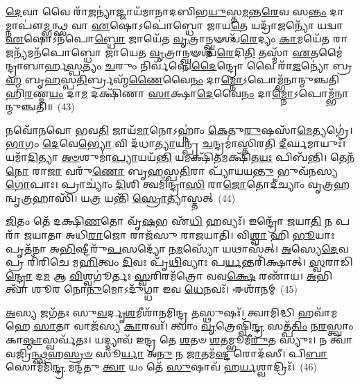 \-\ul{𑌦𑍇}\-𑌵𑌾 𑌵𑍈 𑌰𑌾᳴\-\ul{𑌜}\-𑌨𑍍𑌯𑌾॑𑌜𑍍𑌜𑌾𑌯᳴𑌮𑌾𑌨𑌾𑌦𑌬𑌿𑌭\-\ul{𑌯𑍁}\-𑌸𑍍𑌤\-\ul{𑌮}\-𑌨𑍍𑌤\-\ul{𑌰𑍇}\-𑌵 𑌸\-\ul{𑌨𑍍𑌤𑌂} 𑌦𑌾𑌮𑍍𑌨𑌾𑌪𑍗॑\-\ul{𑌮𑍍𑌭}\-𑌨𑍍𑌥𑍍𑌸 𑌵𑌾 \ul{𑌏}\-𑌷𑍋\-𑌽𑌪𑍋॑𑌬𑍍𑌧𑍋 𑌜𑌾𑌯\-\ul{𑌤𑍇} 𑌯𑌦𑍍𑌰𑌾᳴\-\ul{𑌜}\-𑌨𑍍𑌯𑍋᳴ 𑌯𑌦𑍍𑌵𑌾 \ul{𑌏}\-𑌷𑍋\-𑌽𑌨᳴𑌪𑍋\-\ul{𑌬𑍍𑌧𑍋} 𑌜𑌾𑌯𑍇᳴𑌤 \ul{𑌵𑍃}\-𑌤𑍍𑌰𑌾𑌨𑍍𑌘𑍍𑌨𑍟𑌶𑍍𑌚᳴\-\ul{𑌰𑍇}\-𑌦𑍍𑌯𑌂 \ul{𑌕𑌾}\-𑌮𑌯𑍇᳴𑌤 𑌰𑌾\-\ul{𑌜}\-𑌨𑍍𑌯᳴𑌮𑌨᳴𑌪𑍋𑌬𑍍𑌧𑍋 𑌜𑌾𑌯𑍇𑌤 \ul{𑌵𑍃}\-𑌤𑍍𑌰𑌾𑌨𑍍𑌘𑍍𑌨𑍟𑌶𑍍𑌚᳴\-\ul{𑌰𑍇}\-𑌦𑌿\-\ul{𑌤𑌿} 𑌤𑌸𑍍𑌮𑌾᳴ \ul{𑌏}\-𑌤𑌮𑍈॑𑌨𑍍𑌦𑍍𑌰𑌾𑌬𑌾𑌰𑍍\mbox{}𑌹\-\ul{𑌸𑍍𑌪}\-𑌤𑍍𑌯𑌂 \ul{𑌚}\-𑌰𑍁𑌂 𑌨𑌿𑌰𑍍𑌵᳴𑌪𑍇\-\ul{𑌦𑍈}\-𑌨𑍍𑌦𑍍𑌰𑍋 𑌵𑍈 𑌰𑌾᳴\-\ul{𑌜}\-𑌨𑍍𑌯𑍋॑ 𑌬𑍍𑌰\-\ul{𑌹𑍍𑌮} 𑌬𑍃\-\ul{𑌹}\-𑌸𑍍𑌪\-\ul{𑌤𑌿}\-𑌰𑍍𑌬𑍍𑌰𑌹𑍍𑌮᳴\-\ul{𑌣𑍈}\-𑌵𑍈\-\ul{𑌨𑌂} 𑌦𑌾\-\ul{𑌮𑍍𑌨𑍋}\-\-𑌽𑌪𑍋𑌮𑍍𑌭᳴𑌨𑌾𑌨𑍍𑌮𑍁𑌞𑍍𑌚𑌤𑌿 𑌹𑌿\-\ul{𑌰}\-𑌣𑍍𑌮\-\ul{𑌯𑌂} 𑌦𑌾\-\ul{𑌮} 𑌦𑌕𑍍𑌷𑌿᳴𑌣𑌾 \ul{𑌸𑌾}\-𑌕𑍍𑌷𑌾\-\ul{𑌦𑍇}\-𑌵𑍈\-\ul{𑌨𑌂} 𑌦𑌾\-\ul{𑌮𑍍𑌨𑍋}\-\-𑌽𑌪𑍋𑌮𑍍𑌭᳴𑌨𑌾𑌨𑍍𑌮𑍁𑌞𑍍𑌚𑌤𑌿॥~(43)

{\anuvakamend[{\-\ul{𑌏}\-\-\ul{𑌨𑌂} 𑌦𑍍𑌵𑌾𑌦᳴𑌶 𑌚}]}%

𑌨𑌵𑍋᳴𑌨𑌵𑍋 𑌭𑌵\-\ul{𑌤𑌿} 𑌜𑌾𑌯᳴\-\ul{𑌮𑌾}\-𑌨𑍋\-𑌽𑌹𑍍𑌨𑌾𑌂॑ \ul{𑌕𑍇}\-𑌤𑍁\-\ul{𑌰𑍁}\-𑌷𑌸𑌾᳴\-\ul{𑌮𑍇}\-𑌤𑍍𑌯𑌗𑍍𑌰𑍇॑। \ul{𑌭𑌾}\-𑌗𑌂 \ul{𑌦𑍇}\-𑌵𑍇\-\ul{𑌭𑍍𑌯𑍋} 𑌵𑌿 𑌦᳴𑌧𑌾\-\ul{𑌤𑍍𑌯𑌾}\-𑌯𑌨𑍍𑌪𑍍𑌰 \ul{𑌚}\-𑌨𑍍𑌦𑍍𑌰𑌮𑌾॑𑌸𑍍𑌤𑌿𑌰𑌤𑌿 \ul{𑌦𑍀}\-𑌰𑍍𑌘𑌮𑌾𑌯𑍁𑌃᳴। 𑌯𑌮𑌾᳴\-\ul{𑌦𑌿}\-𑌤𑍍𑌯𑌾 \ul{𑌅}\-\-\ul{𑍞}\-𑌶𑍁𑌮𑌾॑\-\ul{𑌪𑍍𑌯𑌾}\-𑌯𑌯᳴\-\ul{𑌨𑍍𑌤𑌿} 𑌯𑌮𑌕𑍍𑌷𑌿᳴\-\ul{𑌤}\-𑌮𑌕𑍍𑌷𑌿᳴𑌤\-\ul{𑌯𑌃} 𑌪𑌿𑌬᳴𑌨𑍍𑌤𑌿। 𑌤𑍇𑌨᳴ \ul{𑌨𑍋} 𑌰𑌾\-\ul{𑌜𑌾} 𑌵𑌰𑍁᳴\-\ul{𑌣𑍋} 𑌬𑍃\-\ul{𑌹}\-𑌸𑍍𑌪\-\ul{𑌤𑌿}\-𑌰𑌾 𑌪𑍍𑌯𑌾᳴𑌯𑌯\-\ul{𑌨𑍍𑌤𑍁} 𑌭𑍁𑌵᳴𑌨𑌸𑍍𑌯 \ul{𑌗𑍋}\-𑌪𑌾𑌃। 𑌪𑍍𑌰𑌾𑌚𑍍𑌯𑌾𑌂॑ \ul{𑌦𑌿}\-𑌶𑌿 𑌤𑍍𑌵𑌮𑌿᳴𑌨𑍍𑌦𑍍𑌰𑌾\-\ul{𑌸𑌿} 𑌰𑌾\-\ul{𑌜𑍋}\-𑌤𑍋𑌦𑍀॑𑌚𑍍𑌯𑌾𑌂 𑌵𑍃𑌤𑍍𑌰𑌹𑌨𑍍𑌵𑍃\-\ul{𑌤𑍍𑌰}\-𑌹𑌾𑌸𑌿᳴। 𑌯\-\ul{𑌤𑍍𑌰} 𑌯𑌨𑍍𑌤𑌿᳴ \ul{𑌸𑍍𑌰𑍋}\-𑌤𑍍𑌯𑌾𑌸𑍍𑌤𑌤𑍍~(44)

\-\ul{𑌜𑌿}\-𑌤𑌂 𑌤𑍇᳴ 𑌦𑌕𑍍𑌷𑌿\-\ul{𑌣}\-𑌤𑍋 𑌵𑍃᳴\-\ul{𑌷}\-𑌭 𑌏᳴\-\ul{𑌧𑌿} 𑌹𑌵𑍍𑌯𑌃᳴। 𑌇𑌨𑍍𑌦𑍍𑌰𑍋᳴ 𑌜𑌯𑌾\-\ul{𑌤𑌿} 𑌨 𑌪𑌰𑌾᳴ 𑌜𑌯𑌾𑌤𑌾 𑌅𑌧𑌿\-\ul{𑌰𑌾}\-𑌜𑍋 𑌰𑌾𑌜᳴𑌸𑍁 𑌰𑌾𑌜𑌯𑌾𑌤𑌿। 𑌵𑌿\-\ul{𑌶𑍍𑌵𑌾} 𑌹𑌿 \ul{𑌭𑍂}\-𑌯𑌾𑌃 𑌪𑍃𑌤᳴𑌨𑌾 𑌅\-\ul{𑌭𑌿}\-𑌷𑍍𑌟𑍀𑌰𑍁᳴\-\ul{𑌪}\-𑌸𑌦𑍍𑌯𑍋᳴ 𑌨\-\ul{𑌮}\-𑌸𑍍𑌯𑍋᳴ 𑌯𑌥𑌾𑌸᳴𑌤𑍍। \ul{𑌅}\-𑌸𑍍𑌯𑍇\-\ul{𑌦𑍇}\-𑌵 𑌪𑍍𑌰 𑌰𑌿᳴𑌰𑌿𑌚𑍇 𑌮\-\ul{𑌹𑌿}\-𑌤𑍍𑌵𑌂 \ul{𑌦𑌿}\-𑌵𑌃 𑌪𑍃᳴\-\ul{𑌥𑌿}\-𑌵𑍍𑌯𑌾𑌃 𑌪\-\ul{𑌰𑍍𑌯}\-𑌨𑍍𑌤𑌰𑌿᳴𑌕𑍍𑌷𑌾𑌤𑍍। \ul{𑌸𑍍𑌵}\-𑌰𑌾𑌡𑌿\-\ul{𑌨𑍍𑌦𑍍𑌰𑍋} 𑌦\-\ul{𑌮} 𑌆 \ul{𑌵𑌿}\-𑌶𑍍𑌵𑌗𑍂॑𑌰𑍍𑌤𑌃 \ul{𑌸𑍍𑌵}\-𑌰𑌿𑌰𑌮᳴𑌤𑍍𑌰𑍋 𑌵𑌵\-\ul{𑌕𑍍𑌷𑍇} 𑌰𑌣𑌾᳴𑌯। \ul{𑌅}\-𑌭𑌿 𑌤𑍍𑌵𑌾᳴ 𑌶𑍂𑌰 𑌨𑍋\-\ul{𑌨𑍁}\-𑌮𑍋\-𑌽𑌦𑍁᳴𑌗𑍍𑌧𑌾 𑌇𑌵 \ul{𑌧𑍇}\-𑌨𑌵𑌃᳴। 𑌈𑌶𑌾᳴𑌨𑌮𑍍~(45)

\-\ul{𑌅}\-𑌸𑍍𑌯 𑌜𑌗᳴𑌤𑌃 𑌸𑍁\-\ul{𑌵}\-𑌰𑍍𑌦𑍃\-\ul{𑌶}\-𑌮𑍀𑌶𑌾᳴𑌨𑌮𑌿𑌨𑍍𑌦𑍍𑌰 \ul{𑌤}\-𑌸𑍍𑌥𑍁𑌷𑌃᳴। 𑌤𑍍𑌵𑌾𑌮𑌿𑌦𑍍𑌧𑌿 𑌹𑌵𑌾᳴𑌮𑌹𑍇 \ul{𑌸𑌾}\-𑌤𑌾 𑌵𑌾𑌜᳴𑌸𑍍𑌯 \ul{𑌕𑌾}\-𑌰𑌵𑌃᳴। 𑌤𑍍𑌵𑌾𑌂 \ul{𑌵𑍃}\-𑌤𑍍𑌰𑍇𑌷𑍍𑌵𑌿᳴\-\ul{𑌨𑍍𑌦𑍍𑌰} 𑌸𑌤𑍍𑌪᳴\-\ul{𑌤𑌿𑌂} 𑌨\-\ul{𑌰}\-𑌸𑍍𑌤𑍍𑌵𑌾𑌂 𑌕𑌾\-\ul{𑌷𑍍𑌠𑌾}\-𑌸𑍍𑌵𑌰𑍍𑌵᳴𑌤𑌃। 𑌯𑌦𑍍𑌦𑍍𑌯𑌾𑌵᳴ 𑌇𑌨𑍍𑌦𑍍𑌰 𑌤𑍇 \ul{𑌶}\-𑌤𑍞 \ul{𑌶}\-𑌤𑌮𑍍𑌭𑍂𑌮𑍀᳴\-\ul{𑌰𑍁}\-𑌤 𑌸𑍍𑌯𑍁𑌃। 𑌨 𑌤𑍍𑌵𑌾᳴ 𑌵𑌜𑍍𑌰𑌿\-\ul{𑌨𑍍𑌥𑍍𑌸}\-𑌹\-\ul{𑌸𑍍𑌰}\-\-\ul{𑍞} 𑌸𑍂\-\ul{𑌰𑍍𑌯𑌾} 𑌅\-\ul{𑌨𑍁} 𑌨 \ul{𑌜𑌾}\-𑌤𑌮᳴\-\ul{𑌷𑍍𑌟} 𑌰𑍋𑌦᳴𑌸𑍀। 𑌪𑌿\-\ul{𑌬𑌾} 𑌸𑍋𑌮᳴𑌮𑌿\-\ul{𑌨𑍍𑌦𑍍𑌰} 𑌮𑌨𑍍𑌦᳴𑌤𑍁 \ul{𑌤𑍍𑌵𑌾} 𑌯𑌂 𑌤𑍇᳴ \ul{𑌸𑍁}\-𑌷𑌾𑌵᳴ 𑌹\-\ul{𑌰𑍍𑌯}\-𑌶𑍍𑌵𑌾𑌦𑍍𑌰𑌿𑌃᳴।~(46)

